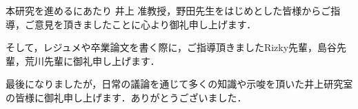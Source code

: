 \theacknowledgments

本研究を進めるにあたり 井上 准教授，野田先生をはじめとした皆様からご指導，ご意見を頂きましたことに心より御礼申し上げます．

そして，レジュメや卒業論文を書く際に，ご指導頂きましたRizky先輩，島谷先輩，荒川先輩に御礼申し上げます．

最後になりましたが，日常の議論を通じて多くの知識や示唆を頂いた井上研究室の皆様に御礼申し上げます．ありがとうございました．
